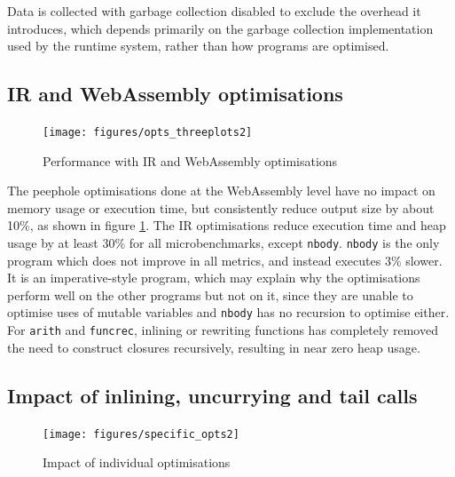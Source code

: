 Data is collected with garbage collection disabled to exclude the overhead it introduces, which depends primarily on the garbage collection implementation used by the runtime system, rather than how programs are optimised.

\subsection{IR and WebAssembly optimisations}
\vspace{-0.4cm}
\begin{figure}[H]
\vspace{-0.05cm}
\hspace{-0.8cm}
\texttt{[image: figures/opts\_threeplots2]}
\vspace{-0.7cm}
\caption{Performance with IR and WebAssembly optimisations}
 \label{fig:opts} 
\end{figure}
The peephole optimisations done at the WebAssembly level have no impact on memory usage or execution time, but consistently reduce output size by about 10\%, as shown in figure \ref{fig:opts}. The IR optimisations reduce execution time and heap usage by at least 30\% for all microbenchmarks, except \verb|nbody|. \verb|nbody| is the only program which does not improve in all metrics, and instead executes 3\% slower. It is an imperative-style program, which may explain why the optimisations perform well on the other programs but not on it, since they are unable to optimise uses of mutable variables and \verb|nbody| has no recursion to optimise either. 
 For \verb|arith| and \verb|funcrec|, inlining or rewriting functions has completely removed the need to construct closures recursively, resulting in near zero heap usage. %

\subsection{Impact of inlining, uncurrying and tail calls}
\vspace{-0.4cm}
\begin{figure}[H]
\hspace{-1.5cm}
\texttt{[image: figures/specific\_opts2]}
\vspace{-0.8cm}
\caption{Impact of individual optimisations}
 \label{fig:specific-opts} 
\end{figure}

